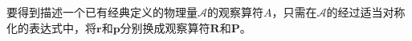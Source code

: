 \documentclass[11pt,a4paper]{article}
\renewcommand{\vec}[1]{\boldsymbol{#1}}
\begin{document}
\begin{tcolorbox}[colback=green!15,colframe=green!40!black,title= ]
要得到描述一个已有经典定义的物理量$\mathscr{A}$的观察算符$A$，只需在$\mathscr{A}$的经过适当对称化的表达式中，将$\vec{r}$和$\vec{p}$分别换成观察算符$\vec{R}$和$\vec{P}$。
\end{tcolorbox}
































































\end{document}
